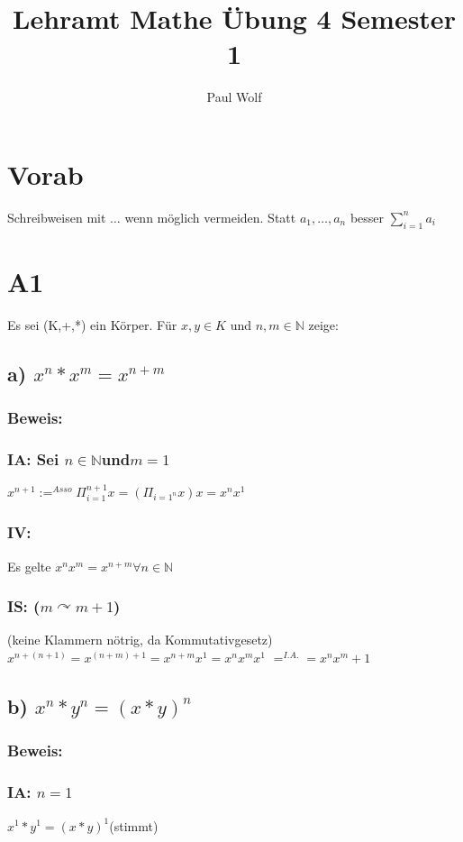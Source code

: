 \documentclass[11pt]{scrartcl}
\title{Lehramt Mathe Übung 4 Semester 1}
\author{Paul Wolf}
\begin{document}
\maketitle


\section{Vorab}
Schreibweisen mit $ \dots $ wenn möglich vermeiden. 
Statt $a_1 , \dots, a_n $ besser $\sum\limits_{i=1}^n a_i$
\section{A1}
Es sei (K,+,*) ein Körper. Für $x,y \in K$ und $n,m \in \mathbb{N}$ zeige:

\subsection{a) $x^n*x^m= x^{n+m}$}
\subsubsection*{Beweis:}
\subsubsection*{IA: Sei $n \in \mathbb{N} $und$ m = 1$}
$x^{n+1} :=^{Asso} \Pi_{i=1}^{n+1} x = (\Pi_{i=1^n} x)x = x^n x^1$

\subsubsection*{IV:}
Es gelte $x^n x^m = x^{n+m} \forall n \in \mathbb{N}$
\subsubsection*{IS: ($m \curvearrowright m+1$)}
(keine Klammern nötrig, da Kommutativgesetz)
$x^{n+(n+1)} = x^{(n+m)+1} = x^{n+m} x^1 = x^n x^m x^1$ 
$=^{I.A.} = x^n x^m+1$

\subsection{b) $x^n*y^n= (x*y)^n$}
\subsubsection*{Beweis:}
\subsubsection*{IA: $n=1$}
$x^1*y^1 = (x*y)^1$(stimmt)
\end{document}
